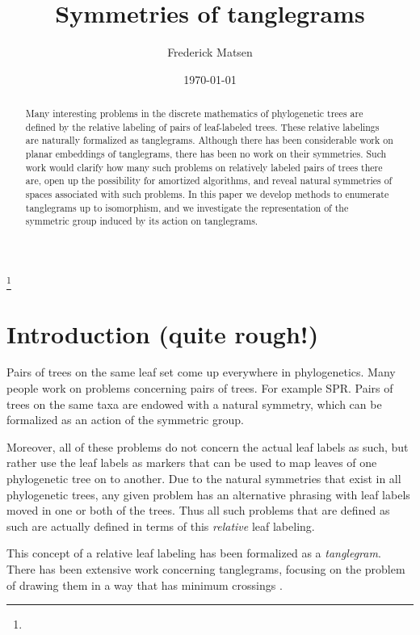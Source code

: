 \documentclass{amsart}
\begin{document}
\title{Symmetries of tanglegrams}
\author[Matsen]{Frederick Matsen}
\address{}
\thanks{}

\date{\today}

\begin{abstract}
Many interesting problems in the discrete mathematics of phylogenetic trees are defined by the relative labeling of pairs of leaf-labeled trees.
These relative labelings are naturally formalized as tanglegrams.
Although there has been considerable work on planar embeddings of tanglegrams, there has been no work on their symmetries.
Such work would clarify how many such problems on relatively labeled pairs of trees there are, open up the possibility for amortized algorithms, and reveal natural symmetries of spaces associated with such problems.
In this paper we develop methods to enumerate tanglegrams up to isomorphism, and we investigate the representation of the symmetric group induced by its action on tanglegrams.
\end{abstract}

\maketitle



\section{Introduction (quite rough!)}
Pairs of trees on the same leaf set come up everywhere in phylogenetics.
Many people work on problems concerning pairs of trees.
For example SPR.
Pairs of trees on the same taxa are endowed with a natural symmetry, which can be formalized as an action of the symmetric group.

Moreover, all of these problems do not concern the actual leaf labels as such, but rather use the leaf labels as markers that can be used to map leaves of one phylogenetic tree on to another.
Due to the natural symmetries that exist in all phylogenetic trees, any given problem has an alternative phrasing with leaf labels moved in one or both of the trees.
Thus all such problems that are defined as such are actually defined in terms of this \emph{relative} leaf labeling.

This concept of a relative leaf labeling has been formalized as a \emph{tanglegram}.
There has been extensive work concerning tanglegrams, focusing on the problem of drawing them in a way that has minimum crossings \cite{Buchin2008-lc,Lozano2008-tp,Bansal2009-ni,Bocker2009-xl,Fernau2010-an,Venkatachalam2010-zh}.
\end{document}
